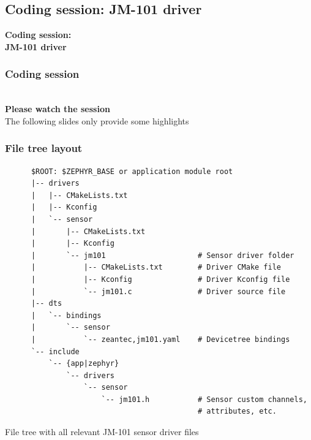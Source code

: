 \documentclass[handout]{beamer}
\begin{document}
\subsection{Coding session: JM-101 driver}

\begin{frame}
  \begin{center}
    \Large \textbf{Coding session:\\JM-101 driver}
  \end{center}
\end{frame}

\begin{frame}
  \frametitle{Coding session}

  \begin{center}
    \Huge \faInfoCircle\\
    \vspace{1ex}
    \Large \textbf{Please watch the session}\\
    \large The following slides only provide some highlights
  \end{center}
\end{frame}

\begin{frame}[fragile]
  \frametitle{File tree layout}

  \begin{listing}[H]
    \begin{verbatim}
      $ROOT: $ZEPHYR_BASE or application module root
      |-- drivers
      |   |-- CMakeLists.txt
      |   |-- Kconfig
      |   `-- sensor
      |       |-- CMakeLists.txt
      |       |-- Kconfig
      |       `-- jm101                     # Sensor driver folder
      |           |-- CMakeLists.txt        # Driver CMake file
      |           |-- Kconfig               # Driver Kconfig file
      |           `-- jm101.c               # Driver source file
      |-- dts
      |   `-- bindings
      |       `-- sensor
      |           `-- zeantec,jm101.yaml    # Devicetree bindings
      `-- include
          `-- {app|zephyr}
              `-- drivers
                  `-- sensor
                      `-- jm101.h           # Sensor custom channels,
                                            # attributes, etc.
    \end{verbatim}
    \caption{File tree with all relevant JM-101 sensor driver files}
  \end{listing}
\end{frame}
\end{document}

